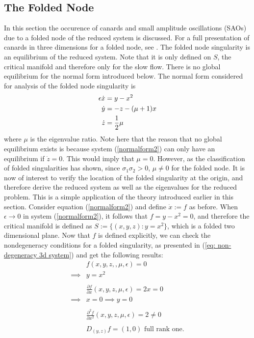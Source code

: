 \subsection{The Folded Node}
In this section the occurence of canards and small amplitude oscillations (SAOs) due to a folded node of the reduced system is discussed. For a full presentation of canards in three dimensions for a folded node, see \citet{wechselberger2005}.
The folded node singularity is an equilibrium of the reduced system. Note that it is only defined on $S$, the critical manifold and therefore only for the slow flow. There is no global equilibrium for the normal form introduced below.
The normal form considered for analysis of the folded node singularity is
\begin{align}\label{normalform2}
\epsilon \dot{x} &= y - x^2\\ \notag
\dot{y} &=- z -(\mu +1)x \\
\dot{z} &= \frac{1}{2} \mu \notag
\end{align}
where $\mu$ is the eigenvalue ratio. Note here that the reason that no global equilibrium exists is because system (\ref{normalform2}) can only have an equilibrium if $\dot{z} =0$. This would imply that $\mu=0$. However, as the classification of folded singularities has shown, since $\sigma_1 \sigma_2 >0$,  $\mu \neq 0$ for the folded node.
It is now of interest to verify the location of the folded singularity at the origin, and therefore derive the reduced system as well as the eigenvalues for the reduced problem.
This is a simple application of the theory introduced earlier in this section.
Consider equation (\ref{normalform2}) and define $\dot{x}:=f$ as before. When $\epsilon \to 0$ in system (\ref{normalform2}), it follows that $f= y-x^2 =0$, and therefore the critical manifold is defined as $S:= \{ (x,y,z) : y=x^2\}$, which is a folded two dimensional plane.
Now that $f$ is defined explicitly, we can check the nondegeneracy conditions for a folded singularity, as presented in (\ref{eq: non-degeneracy 3d system}) and get the following results:
\begin{align*}
&f(x,y,z,,\mu, \epsilon) = 0\\
\implies& y=x^2\\
\\
&\frac{\partial f}{\partial x} (x,y,z,\mu,\epsilon) = 2x = 0\\
\implies &x=0 \implies y=0 \\
\\
&\frac{\partial^2 f}{\partial x^2}(x,y,z,\mu,\epsilon)  = 2 \neq 0\\
\\
&D_{(y,z)}f= (1,0) \textrm{ full rank one}.
\end{align*}
